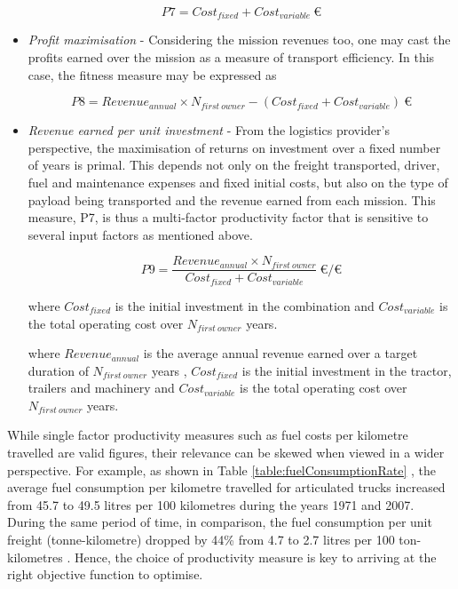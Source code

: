 \documentclass[ExampleMasters.tex]{subfiles}
\begin{document}
\begin{itemize}
			\begin{equation}
				P7 = Cost_{fixed} + Cost_{variable}\  \euro
			\end{equation}

			\item \textit{Profit maximisation} - Considering the mission revenues too, one may cast the profits earned over the mission as a measure of transport efficiency. In this case, the fitness measure may be expressed as 

			\begin{equation}
				P8 = {Revenue_{annual} \times N_{first\ owner}}-(Cost_{fixed} + Cost_{variable})\  \euro
			\end{equation}

			\item \textit{Revenue earned per unit investment} - From the logistics provider's perspective, the maximisation of returns on investment over a fixed number of years is primal. This depends not only on the freight transported, driver, fuel and maintenance expenses and fixed initial costs, but also on the type of payload being transported and the revenue earned from each mission. This measure, P7, is thus a multi-factor productivity factor that is sensitive to several input factors as mentioned above.

			\begin{equation}
				P9 = \frac{Revenue_{annual} \times N_{first\ owner}}{Cost_{fixed} + Cost_{variable}}\ \euro/\euro
			\end{equation}

			where $Cost_{fixed}$ is the initial investment in the combination and $Cost_{variable}$ is the total operating cost over $N_{first\ owner}$ years.

			where $Revenue_{annual}$  is the average annual revenue earned over a target duration of $N_{first\ owner}$ years , $Cost_{fixed}$  is the initial investment in the tractor, trailers and machinery and $Cost_{variable}$  is the total operating cost over $N_{first\ owner}$ years.

		\end{itemize}

		While single factor productivity measures such as fuel costs per kilometre travelled are valid figures, their relevance can be skewed when viewed in a wider perspective. For example, as shown in Table \ref{table:fuelConsumptionRate} \cite[T.~2.8]{TruckProdAus}, the average fuel consumption per kilometre travelled for articulated trucks increased from 45.7 to 49.5 litres per 100 kilometres during the years 1971 and 2007. During the same period of time, in comparison, the fuel consumption per unit freight (tonne-kilometre) dropped by 44\% from 4.7 to 2.7 litres per 100 ton-kilometres \cite{TruckProdAus}. Hence, the choice of productivity measure is key to arriving at the right objective function to optimise.\\
\end{document}
